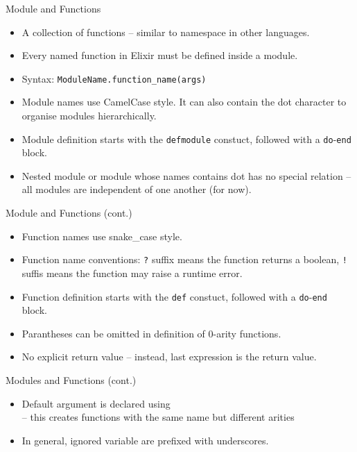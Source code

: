 \documentclass[12pt]{beamer}
\begin{document}
\begin{frame}[fragile]{Module and Functions}
  \begin{itemize}
    \item A collection of functions -- similar to namespace in other languages.
    \item Every named function in Elixir must be defined inside a module.
    \item Syntax: \texttt{ModuleName.function\_name(args)}
    \item Module names use CamelCase style. It can also contain the dot character to organise modules hierarchically.
    \item Module definition starts with the \texttt{defmodule} constuct, followed with a \texttt{do}-\texttt{end} block.
    \item Nested module or module whose names contains dot has no special relation -- all modules are independent of one another (for now).
  \end{itemize}
\end{frame}

\begin{frame}{Module and Functions (cont.)}
  \begin{itemize}
    \item Function names use snake\_case style.
    \item Function name conventions: \texttt{?} suffix means the function returns a boolean, \texttt{!} suffis means the function may raise a runtime error.
    \item Function definition starts with the \texttt{def} constuct, followed with a \texttt{do}-\texttt{end} block.
    \item Parantheses can be omitted in definition of 0-arity functions.
    \item No explicit return value -- instead, last expression is the return value.
  \end{itemize}
\end{frame}

\begin{frame}{Modules and Functions (cont.)}
  \begin{itemize}
    \item Default argument is declared using \texttt{\\} -- this creates functions with the same name but different arities
    \item In general, ignored variable are prefixed with underscores.
  \end{itemize}
\end{frame}
\end{document}
